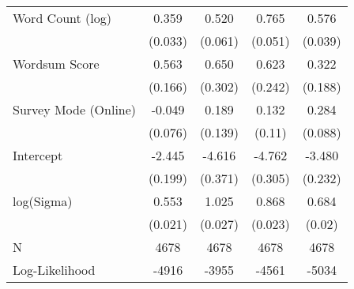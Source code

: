 \begin{table}[ht]
\begin{tabular}{lcccc}
  Word Count (log) &  0.359 &  0.520 &  0.765 &  0.576 \\ 
   & (0.033) & (0.061) & (0.051) & (0.039) \\ 
  Wordsum Score &  0.563 &  0.650 &  0.623 &  0.322 \\ 
   & (0.166) & (0.302) & (0.242) & (0.188) \\ 
  Survey Mode (Online) & -0.049 &  0.189 &  0.132 &  0.284 \\ 
   & (0.076) & (0.139) & (0.11) & (0.088) \\ 
  Intercept & -2.445 & -4.616 & -4.762 & -3.480 \\ 
   & (0.199) & (0.371) & (0.305) & (0.232) \\ 
  log(Sigma) &  0.553 &  1.025 &  0.868 &  0.684 \\ 
   & (0.021) & (0.027) & (0.023) & (0.02) \\ 
   \hline
N & 4678 & 4678 & 4678 & 4678 \\ 
  Log-Likelihood & -4916 & -3955 & -4561 & -5034 \\ 
   \hline
\end{tabular}
\endgroup
\end{table}
